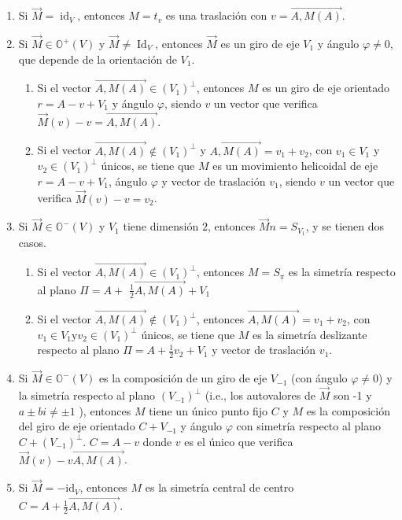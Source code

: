\documentclass[12pt, a4paper, ones, notitlepage, openany,titlepage]{article}
\newcommand{\identidad}{\operatorname{Id}}
\begin{document}
\begin{enumerate}[label=(\arabic*)]
\item Si $\overrightarrow{M}=\operatorname{id}_{V}$, entonces $M=t_{v}$ es una traslación con $v=\overrightarrow{A, M(A)}$.

\item Si $\overrightarrow{M} \in \mathbb{O}^{+}(V)$ y $\overrightarrow{M} \neq \identidad_{V}$, entonces $\overrightarrow{M}$ es un giro de eje $V_{1}$ y ángulo $\varphi \neq 0$, que depende de la orientación de $V_{1}$.
\begin{enumerate}[label=(\alph*)]
	\item Si el vector $\overrightarrow{A, M(A)} \in\left(V_{1}\right)^{\perp}$, entonces $M$ es un giro de eje orientado $r=A-v+V_{1}$ y ángulo $\varphi$, siendo $v$ un vector que verifica $\overrightarrow{M}(v)-v=\overrightarrow{A, M(A)}$.
	
	\item Si el vector $\overrightarrow{A, M(A)} \notin\left(V_{1}\right)^{\perp}$ y $\overrightarrow{A, M(A)}=v_{1}+v_{2}$, con $v_{1} \in V_{1}$ y $v_{2} \in\left(V_{1}\right)^{\perp}$ únicos, se tiene que $M$ es un movimiento helicoidal de eje $r=A-v+V_{1}$, ángulo $\varphi$ y vector de traslación $v_{1}$, siendo $v$ un vector que verifica $\overrightarrow{M}(v)-v=v_{2}$.
\end{enumerate}

\item Si $\overrightarrow{M} \in \mathbb{O}^{-}(V)$ y $V_1$ tiene dimensión $2$, entonces $\overrightarrow{M}n = S_{V_1}$, y se tienen dos casos.
\begin{enumerate}[label=(\arabic*)]
	\item Si el vector $\overrightarrow{A, M(A)} \in\left(V_{1}\right)^{\perp}$, entonces $M = S_\pi$ es la simetría respecto al plano $\Pi=A+$ $\frac{1}{2} \overrightarrow{A, M(A)}+V_{1}$
	
	\item Si el vector $\overrightarrow{A, M(A)} \notin\left(V_{1}\right)^{\perp}$, entonces $\overrightarrow{A, M(A)}=v_{1}+v_{2}$, con $v_{1} \in V_{1} \mathrm{y} v_{2} \in\left(V_{1}\right)^{\perp}$ únicos, se tiene que $M$ es la simetría deslizante respecto al plano $\Pi=A+\frac{1}{2} v_{2}+V_{1}$ y vector de traslación $v_{1}$.
\end{enumerate}

\item Si $\overrightarrow{M} \in \mathbb{O}^{-}(V)$ es la composición de un giro de eje $V_{-1}$ (con ángulo $\varphi \neq 0$) y la simetría respecto al plano $\left(V_{-1}\right)^{\perp}$ (i.e., los autovalores de $\overrightarrow{M}$ son -1 y $a \pm b i \neq \pm 1$ ), entonces $M$ tiene un único punto fijo $C$ y $M$ es la composición del giro de eje orientado $C+V_{-1}$ y ángulo $\varphi$ con simetría respecto al plano $C+\left(V_{-1}\right)^{\perp}$. $C = A - v$ donde $v$ es el único que verifica $\overrightarrow{M}(v) - v \overrightarrow{A,M(A)}$.

\item Si $\overrightarrow{M}=-\mathrm{id}_{V}$, entonces $M$ es la simetría central de centro $C=A+\frac{1}{2} \overrightarrow{A, M(A)}$.
\end{enumerate}
\end{document}
